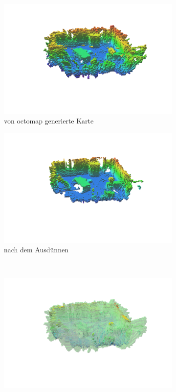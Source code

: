 \documentclass[12pt,titlepage, a4paper]{article}
\begin{document}
\begin{figure}[h!]
	\centering
	\begin{subfigure}[h]{0.45\textwidth}
		\includegraphics[width=\textwidth]{./maps/beforePrune.png}
		\caption{von octomap generierte Karte}
	\end{subfigure}
	\begin{subfigure}[h]{0.45\textwidth}
		\includegraphics[width=\textwidth]{./maps/beforeMorph.png}
		\caption{nach dem Ausdünnen}
	\end{subfigure}\\
	\begin{subfigure}[h]{0.45\textwidth}
		\includegraphics[width=\textwidth]{./maps/beforeMorph_free.png}

\end{subfigure}
\end{figure}
\end{document}

